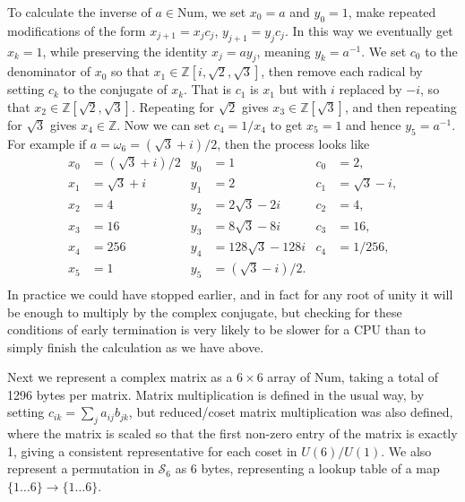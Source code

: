 To calculate the inverse of $a \in \text{Num}$, we set $x_0 = a$ and $y_0 = 1$, make repeated modifications of the form $x_{j+1} = x_jc_j$, $y_{j+1} = y_jc_j$. In this way we eventually get $x_k = 1$, while preserving the identity $x_j = ay_j$, meaning $y_k = a^{-1}$. We set $c_0$ to the denominator of $x_0$ so that $x_1 \in \mathbb{Z}[i, \sqrt{2}, \sqrt{3}]$, then remove each radical by setting $c_k$ to the conjugate of $x_k$. That is $c_1$ is $x_1$ but with $i$ replaced by $-i$, so that $x_2 \in \mathbb{Z}[\sqrt{2}, \sqrt{3}]$. Repeating for $\sqrt{2}$ gives $x_3 \in \mathbb{Z}[\sqrt{3}]$, and then repeating for $\sqrt{3}$ gives $x_4 \in \mathbb{Z}$. Now we can set $c_4 = 1/x_4$ to get $x_5 = 1$ and hence $y_5 = a^{-1}$. For example if $a = \omega_{6} = (\sqrt{3} + i)/2$, then the process looks like
\begin{align*}
	x_0 &= (\sqrt{3} + i)/2 & y_0 &= 1 & c_0 &= 2, \\
	x_1 &= \sqrt{3} + i & y_1 &= 2 & c_1 &= \sqrt{3}-i, \\
	x_2 &= 4 & y_2 &= 2\sqrt{3}-2i & c_2 &= 4, \\
	x_3 &= 16 & y_3 &= 8\sqrt{3}-8i & c_3 &= 16, \\
	x_4 &= 256 & y_4 &= 128\sqrt{3}-128i & c_4 &= 1/256, \\
	x_5 &= 1 & y_5 &= (\sqrt{3}-i)/2. & \\
\end{align*}
In practice we could have stopped earlier, and in fact for any root of unity it will be enough to multiply by the complex conjugate, but checking for these conditions of early termination is very likely to be slower for a CPU than to simply finish the calculation as we have above.

Next we represent a complex matrix as a $6\times 6$ array of Num, taking a total of 1296 bytes per matrix. Matrix multiplication is defined in the usual way, by setting $c_{ik} = \sum_j a_{ij}b_{jk}$, but reduced/coset matrix multiplication was also defined, where the matrix is scaled so that the first non-zero entry of the matrix is exactly 1, giving a consistent representative for each coset in $U(6)/U(1)$. We also represent a permutation in $\mathcal{S}_6$ as 6 bytes, representing a lookup table of a map $\{1\dots 6\} \to \{1 \dots 6\}$.

